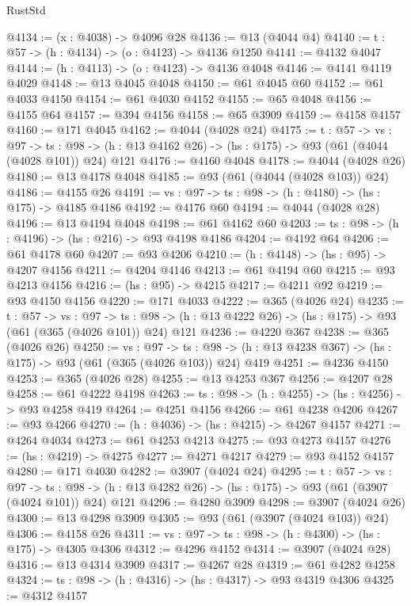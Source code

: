 \begin{lexlean}{RustStd}
\begin{coremodule}
@4134 := (x : @4038) -> @4096 @28
@4136 := @13 (@4044 @4)
@4140 := {t : @57} -> (h : @4134) -> (o : @4123) -> @4136 @1250
@4141 := @4132 @4047
@4144 := (h : @4113) -> (o : @4123) -> @4136 @4048
@4146 := @4141 @4119 @4029
@4148 := @13 @4045 @4048
@4150 := @61 @4045 @60
@4152 := @61 @4033 @4150
@4154 := @61 @4030 @4152
@4155 := @65 @4048
@4156 := @4155 @64
@4157 := @394 @4156
@4158 := @65 @3909
@4159 := @4158 @4157
@4160 := @171 @4045
@4162 := @4044 (@4028 @24)
@4175 := {t : @57} ->
  {vs : @97} ->
  {ts : @98} -> (h : @13 @4162 @26) -> (hs : @175) -> @93 (@61 (@4044 (@4028 @101)) @24) @121
@4176 := @4160 @4048
@4178 := @4044 (@4028 @26)
@4180 := @13 @4178 @4048
@4185 := @93 (@61 (@4044 (@4028 @103)) @24)
@4186 := @4155 @26
@4191 := {vs : @97} -> {ts : @98} -> (h : @4180) -> (hs : @175) -> @4185 @4186
@4192 := @4176 @60
@4194 := @4044 (@4028 @28)
@4196 := @13 @4194 @4048
@4198 := @61 @4162 @60
@4203 := {ts : @98} -> (h : @4196) -> (hs : @216) -> @93 @4198 @4186
@4204 := @4192 @64
@4206 := @61 @4178 @60
@4207 := @93 @4206
@4210 := (h : @4148) -> (hs : @95) -> @4207 @4156
@4211 := @4204 @4146
@4213 := @61 @4194 @60
@4215 := @93 @4213 @4156
@4216 := (hs : @95) -> @4215
@4217 := @4211 @92
@4219 := @93 @4150 @4156
@4220 := @171 @4033
@4222 := @365 (@4026 @24)
@4235 := {t : @57} ->
  {vs : @97} ->
  {ts : @98} -> (h : @13 @4222 @26) -> (hs : @175) -> @93 (@61 (@365 (@4026 @101)) @24) @121
@4236 := @4220 @367
@4238 := @365 (@4026 @26)
@4250 := {vs : @97} ->
  {ts : @98} -> (h : @13 @4238 @367) -> (hs : @175) -> @93 (@61 (@365 (@4026 @103)) @24) @419
@4251 := @4236 @4150
@4253 := @365 (@4026 @28)
@4255 := @13 @4253 @367
@4256 := @4207 @28
@4258 := @61 @4222 @4198
@4263 := {ts : @98} -> (h : @4255) -> (hs : @4256) -> @93 @4258 @419
@4264 := @4251 @4156
@4266 := @61 @4238 @4206
@4267 := @93 @4266
@4270 := (h : @4036) -> (hs : @4215) -> @4267 @4157
@4271 := @4264 @4034
@4273 := @61 @4253 @4213
@4275 := @93 @4273 @4157
@4276 := (hs : @4219) -> @4275
@4277 := @4271 @4217
@4279 := @93 @4152 @4157
@4280 := @171 @4030
@4282 := @3907 (@4024 @24)
@4295 := {t : @57} ->
  {vs : @97} ->
  {ts : @98} -> (h : @13 @4282 @26) -> (hs : @175) -> @93 (@61 (@3907 (@4024 @101)) @24) @121
@4296 := @4280 @3909
@4298 := @3907 (@4024 @26)
@4300 := @13 @4298 @3909
@4305 := @93 (@61 (@3907 (@4024 @103)) @24)
@4306 := @4158 @26
@4311 := {vs : @97} -> {ts : @98} -> (h : @4300) -> (hs : @175) -> @4305 @4306
@4312 := @4296 @4152
@4314 := @3907 (@4024 @28)
@4316 := @13 @4314 @3909
@4317 := @4267 @28
@4319 := @61 @4282 @4258
@4324 := {ts : @98} -> (h : @4316) -> (hs : @4317) -> @93 @4319 @4306
@4325 := @4312 @4157

\end{coremodule}
\end{lexlean}
